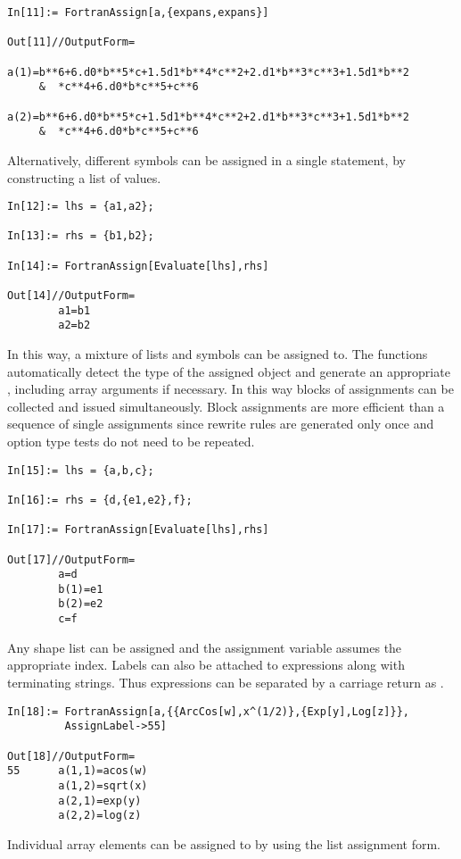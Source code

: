 \documentclass [12pt,twoside]{article}
\begin{document}
\begin{verbatim}
In[11]:= FortranAssign[a,{expans,expans}]

Out[11]//OutputForm=
        a(1)=b**6+6.d0*b**5*c+1.5d1*b**4*c**2+2.d1*b**3*c**3+1.5d1*b**2
     &  *c**4+6.d0*b*c**5+c**6
        a(2)=b**6+6.d0*b**5*c+1.5d1*b**4*c**2+2.d1*b**3*c**3+1.5d1*b**2
     &  *c**4+6.d0*b*c**5+c**6
\end{verbatim}
Alternatively, different symbols can be assigned in a single statement,
by constructing a list of  values.
\begin{verbatim}
In[12]:= lhs = {a1,a2};

In[13]:= rhs = {b1,b2};

In[14]:= FortranAssign[Evaluate[lhs],rhs]

Out[14]//OutputForm=
        a1=b1
        a2=b2
\end{verbatim}
In this way, a mixture of lists and symbols can be assigned to. The
 functions automatically detect the type of the assigned
object and generate an appropriate , including array
arguments if necessary. In this way blocks of assignments can be
collected and issued simultaneously. Block assignments are more efficient than
a sequence of single assignments since rewrite rules are generated only once
and option type tests do not need to be repeated.

\begin{verbatim}
In[15]:= lhs = {a,b,c};

In[16]:= rhs = {d,{e1,e2},f};

In[17]:= FortranAssign[Evaluate[lhs],rhs]

Out[17]//OutputForm=
        a=d
        b(1)=e1
        b(2)=e2
        c=f
\end{verbatim}
Any shape list can be assigned and the assignment variable assumes the
appropriate index. Labels can also be attached to expressions along with
terminating strings. Thus expressions can be separated by a carriage
return as .

\begin{verbatim}
In[18]:= FortranAssign[a,{{ArcCos[w],x^(1/2)},{Exp[y],Log[z]}},
         AssignLabel->55]

Out[18]//OutputForm=
55      a(1,1)=acos(w)
        a(1,2)=sqrt(x)
        a(2,1)=exp(y)
        a(2,2)=log(z)
\end{verbatim}
Individual array elements can be assigned to by using the list assignment
form.
\end{document}
